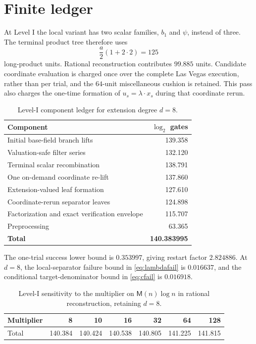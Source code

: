 \documentclass[11pt]{article}
\theoremstyle{definition}
\newcommand{\M}{\mathsf M}
\begin{document}
\section{Finite ledger}

At Level I the local variant has two scalar families, $b_1$ and $\psi$, instead of three.  The terminal product tree therefore uses
\[
 \frac a2(1+2\cdot2)=125
\]
long-product units.  Rational reconstruction contributes $99.885$ units.  Candidate coordinate evaluation is charged once over the complete Las Vegas execution, rather than per trial, and the $64$-unit miscellaneous cushion is retained.  This pass also charges the one-time formation of $u_s=\lambda\cdot x_s$ during that coordinate rerun.

\begin{table}[h]
\centering
\caption{Level-I component ledger for extension degree $d=8$.}
\label{tab:components}
\begin{tabularx}{0.88\textwidth}{@{}Xr@{}}
\toprule
Component & $\log_2$ gates\\
\midrule
Initial base-field branch lifts & 139.358\\
Valuation-safe filter series & 132.120\\
Terminal scalar recombination & 138.791\\
One on-demand coordinate re-lift & 137.860\\
Extension-valued leaf formation & 127.610\\
Coordinate-rerun separator leaves & 124.898\\
Factorization and exact verification envelope & 115.707\\
Preprocessing & 63.365\\
\midrule
\textbf{Total} & \textbf{140.383995}\\
\bottomrule
\end{tabularx}
\end{table}

The one-trial success lower bound is $0.353997$, giving restart factor $2.824886$.  At $d=8$, the local-separator failure bound in \eqref{eq:lambdafail} is $0.016637$, and the conditional target-denominator bound in \eqref{eq:cfail} is $0.016918$.

\begin{table}[h]
\centering
\caption{Level-I sensitivity to the multiplier on $\M(n)\log n$ in rational reconstruction, retaining $d=8$.}
\label{tab:sensitivity}
\begin{tabular}{@{}lrrrrrr@{}}
\toprule
Multiplier & 8 & 10 & 16 & 32 & 64 & 128\\
\midrule
Total & 140.384 & 140.424 & 140.538 & 140.805 & 141.225 & 141.815\\
\bottomrule
\end{tabular}
\end{table}
\end{document}
